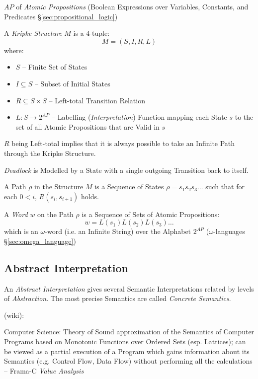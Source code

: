$AP$ of \emph{Atomic Propositions} (Boolean
Expressions over Variables, Constants, and Predicates
\S\ref{sec:propositional_logic})

A \emph{Kripke Structure} $M$ is a $4$-tuple:
\[
  M = (S, I, R, L)
\]
where:
\begin{itemize}
  \item $S$ -- Finite Set of States
  \item $I \subseteq S$ -- Subset of Initial States
  \item $R \subseteq S \times S$ -- Left-total Transition Relation
  \item $L : S \rightarrow 2^{AP}$ -- Labelling
    (\emph{Interpretation}) Function mapping each State $s$ to the set
    of all Atomic Propositions that are Valid in $s$
\end{itemize}
$R$ being Left-total implies that it is always possible to take an
Infinite Path through the Kripke Structure.

\emph{Deadlock} is Modelled by a State with a single outgoing
Transition back to itself.

A Path $\rho$ in the Structure $M$ is a Sequence of States $\rho =
s_1s_2s_3\ldots$ such that for each $0 < i$, $R(s_i, s_{i+1})$ holds.

A \emph{Word} $w$ on the Path $\rho$ is a Sequence of Sets of Atomic
Propositions:
\[
  w = L(s_1)L(s_2)L(s_3)\ldots
\]
which is an $\omega$-word (i.e. an Infinite String) over the Alphabet
$2^{AP}$ (\fist $\omega$-languages \S\ref{sec:omega_language})



\subsection{Abstract Interpretation}\label{sec:abstract_interpretation}

An \emph{Abstract Interpretation} gives several Semantic
Interpretations related by levels of \emph{Abstraction}. The most
precise Semantics are called \emph{Concrete Semantics}.

(wiki):

Computer Science: Theory of Sound approximation of the Semantics of
Computer Programs based on Monotonic Functions over Ordered Sets (esp.
Lattices); can be viewed as a partial execution of a Program which
gains information about its Semantics (e.g. Control Flow, Data Flow)
without performing all the calculations -- Frama-C \emph{Value
  Analysis}


